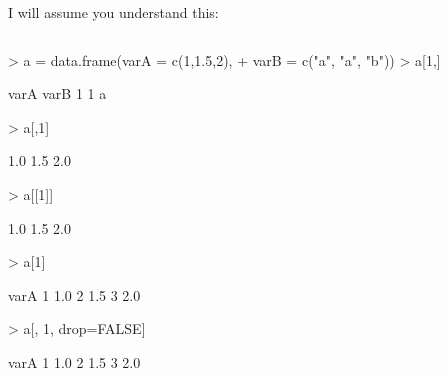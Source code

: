 \documentclass{beamer}
\begin{document}
\begin{frame}{I will assume you understand this:}
\begin{columns}
\begin{column}{6cm}

\begin{tiny}
\begin{Schunk}
\begin{Sinput}
> a = data.frame(varA = c(1,1.5,2), 
+ 	varB = c("a", "a", "b"))
> a[1,]
\end{Sinput}
\begin{Soutput}
  varA varB
1    1    a
\end{Soutput}
\begin{Sinput}
> a[,1]
\end{Sinput}
\begin{Soutput}
[1] 1.0 1.5 2.0
\end{Soutput}
\begin{Sinput}
> a[[1]]
\end{Sinput}
\begin{Soutput}
[1] 1.0 1.5 2.0
\end{Soutput}
\begin{Sinput}
> a[1]
\end{Sinput}
\begin{Soutput}
  varA
1  1.0
2  1.5
3  2.0
\end{Soutput}
\begin{Sinput}
> a[, 1, drop=FALSE]
\end{Sinput}
\begin{Soutput}
  varA
1  1.0
2  1.5
3  2.0
\end{Soutput}
\end{Schunk}
\end{tiny}


\end{column}
\end{columns}
\end{frame}
\end{document}
